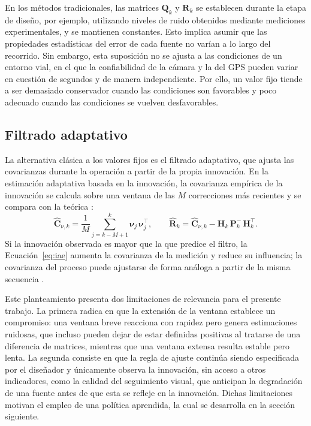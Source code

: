 En los métodos tradicionales, las matrices $\mathbf{Q}_k$ y $\mathbf{R}_k$ se establecen durante la etapa de diseño, por ejemplo, utilizando niveles de ruido obtenidos mediante mediciones experimentales, y se mantienen constantes.
Esto implica asumir que las propiedades estadísticas del error de cada fuente no varían a lo largo del recorrido.
Sin embargo, esta suposición no se ajusta a las condiciones de un entorno vial, en el que la confiabilidad de la cámara y la del GPS pueden variar en cuestión de segundos y de manera independiente.
Por ello, un valor fijo tiende a ser demasiado conservador cuando las condiciones son favorables y poco adecuado cuando las condiciones se vuelven desfavorables.

\subsection{Filtrado adaptativo}

La alternativa clásica a los valores fijos es el filtrado adaptativo, que ajusta las covarianzas durante la operación a partir de la propia innovación.
En la estimación adaptativa basada en la innovación, la covarianza empírica de la innovación se calcula sobre una ventana de las $M$ correcciones más recientes y se compara con la teórica \cite{mohamed1999adaptive}:
\begin{equation}
\hat{\mathbf{C}}_{\nu,k} = \frac{1}{M}\sum_{j=k-M+1}^{k} \boldsymbol{\nu}_j\,\boldsymbol{\nu}_j^{\top},
\qquad
\hat{\mathbf{R}}_k = \hat{\mathbf{C}}_{\nu,k} - \mathbf{H}_k\,\mathbf{P}_k^{-}\,\mathbf{H}_k^{\top}.
\label{eq:iae}
\end{equation}
Si la innovación observada es mayor que la que predice el filtro, la Ecuación~\eqref{eq:iae} aumenta la covarianza de la medición y reduce su influencia; la covarianza del proceso puede ajustarse de forma análoga a partir de la misma secuencia \cite{mohamed1999adaptive}.

Este planteamiento presenta dos limitaciones de relevancia para el presente trabajo.
La primera radica en que la extensión de la ventana establece un compromiso: una ventana breve reacciona con rapidez pero genera estimaciones ruidosas, que incluso pueden dejar de estar definidas positivas al tratarse de una diferencia de matrices, mientras que una ventana extensa resulta estable pero lenta.
La segunda consiste en que la regla de ajuste continúa siendo especificada por el diseñador y únicamente observa la innovación, sin acceso a otros indicadores, como la calidad del seguimiento visual, que anticipan la degradación de una fuente antes de que esta se refleje en la innovación.
Dichas limitaciones motivan el empleo de una política aprendida, la cual se desarrolla en la sección siguiente.

